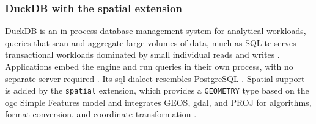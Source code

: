 

\subsubsection{DuckDB with the spatial extension}
\label{background:spatial-data-formats-and-storage-models:full-database-engines:duckdb-with-the-spatial-extension}
DuckDB is an in-process database management system for analytical workloads, queries that scan and aggregate large volumes of data, much as SQLite serves transactional workloads dominated by small individual reads and writes \parencite{raasveldt2019_duckdb_embeddable_analytical_database}. Applications embed the engine and run queries in their own process, with no separate server required \parencite{raasveldt2019_duckdb_embeddable_analytical_database}. Its \acrshort{sql} dialect resembles PostgreSQL \parencite{duckdb2025_sql_introduction}. Spatial support is added by the \texttt{spatial} extension, which provides a \texttt{GEOMETRY} type based on the \acrshort{ogc} Simple Features model and integrates GEOS, \acrshort{gdal}, and PROJ for algorithms, format conversion, and coordinate transformation \parencite{gabrielsson2023_postgeese_duckdb_spatial_extension, duckdb2025_spatial_extension_overview}.

